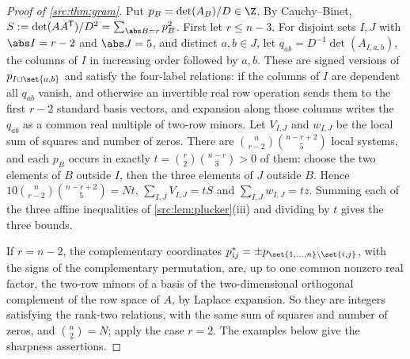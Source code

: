\begin{proof}[Proof of \cref{src:thm:gram}]
Put $p_B=\det(A_B)/D\in\Z$. By Cauchy--Binet,
$S:=\det(AA^{\srctr})/D^2=\sum_{\abs B=r}p_B^2$. First let $r\le n-3$. For disjoint sets
$I,J$ with $\abs I=r-2$ and $\abs J=5$, and distinct $a,b\in J$, let
$q_{ab}=D^{-1}\det(A_{I,a,b})$, the columns of $I$ in increasing order followed by $a,b$. These
are signed versions of $p_{I\cup\set{a,b}}$ and satisfy the four-label relations: if the
columns of $I$ are dependent all $q_{ab}$ vanish, and otherwise an invertible real row
operation sends them to the first $r-2$ standard basis vectors, and expansion along those
columns writes the $q_{ab}$ as a common real multiple of two-row minors. Let $V_{I,J}$ and
$w_{I,J}$ be the local sum of squares and number of zeros. There are
$\binom n{r-2}\binom{n-r+2}5$ local systems, and each $p_B$ occurs in exactly
$t=\binom r2\binom{n-r}3>0$ of them: choose the two elements of $B$ outside $I$, then the three
elements of $J$ outside $B$. Hence $10\binom n{r-2}\binom{n-r+2}5=Nt$,
$\sum_{I,J}V_{I,J}=tS$ and $\sum_{I,J}w_{I,J}=tz$. Summing each of the three affine
inequalities of \cref{src:lem:plucker}(iii) and dividing by $t$ gives the three bounds.

If $r=n-2$, the complementary coordinates $p^*_{ij}=\pm p_{\set{1,\dots,n}\setminus\set{i,j}}$,
with the signs of the complementary permutation, are, up to one common nonzero real factor, the
two-row minors of a basis of the two-dimensional orthogonal complement of the row space of $A$,
by Laplace expansion. So they are integers satisfying the rank-two relations, with the same
sum of squares and number of zeros, and $\binom n2=N$; apply the case $r=2$. The examples below
give the sharpness assertions.
\end{proof}

